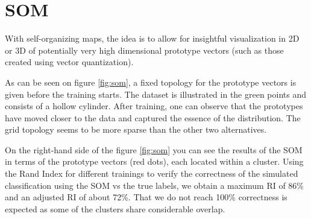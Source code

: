 \documentclass[11pt, a4paper]{article}
\begin{document}
\section{SOM}
With self-organizing maps, the idea is to allow for insightful
visualization in 2D or 3D of potentially very high dimensional
prototype vectors (such as those created using vector quantization).

As can be seen on figure \ref{fig:som}, a fixed topology for the
prototype vectors is given before the training starts. The dataset is
illustrated in the green points and consists of a hollow
cylinder. After training, one can observe that the prototypes have
moved closer to the data and captured the essence of the
distribution. The grid topology seems to be more sparse than the other
two alternatives.

On the right-hand side of the figure \ref{fig:som} you can see the
results of the SOM in terms of the prototype vectors (red dots), each
located within a cluster. Using the Rand Index for different trainings
to verify the correctness of the simulated classification using the
SOM vs the true labels, we obtain a maximum RI of 86\% and an adjusted
RI of about 72\%. That we do not reach 100\% correctness is expected
as some of the clusters share considerable overlap.
\end{document}
